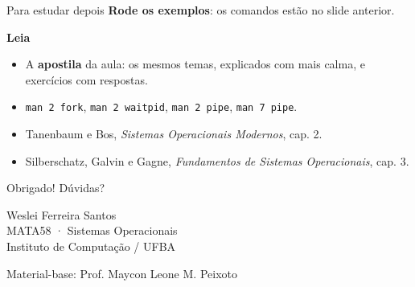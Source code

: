 \documentclass[aspectratio=169]{beamer}
\begin{document}
\begin{frame}[fragile]{Para estudar depois}
\textbf{Rode os exemplos}: os comandos estão no slide anterior.

\vspace{0.5em}
\textbf{Leia}
\begin{itemize}
    \item A \textbf{apostila} da aula: os mesmos temas, explicados com mais calma, e exercícios com respostas.
    \item \texttt{man 2 fork}, \texttt{man 2 waitpid}, \texttt{man 2 pipe}, \texttt{man 7 pipe}.
    \item Tanenbaum e Bos, \emph{Sistemas Operacionais Modernos}, cap. 2.
    \item Silberschatz, Galvin e Gagne, \emph{Fundamentos de Sistemas Operacionais}, cap. 3.
\end{itemize}
\end{frame}

\begin{frame}{Obrigado!}
\centering
{\Large Dúvidas?}
\vspace{2em}

Weslei Ferreira Santos\\
MATA58 · Sistemas Operacionais\\
Instituto de Computação / UFBA

\vspace{1.5em}
{\scriptsize Material-base: Prof. Maycon Leone M. Peixoto}
\end{frame}
\end{document}
